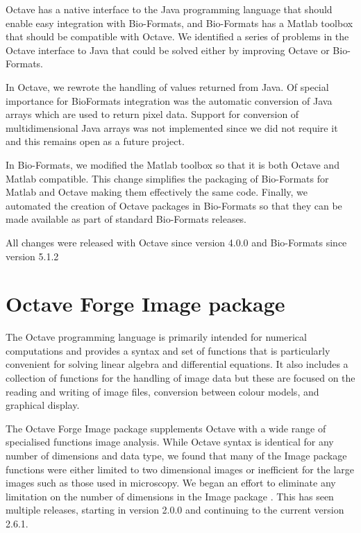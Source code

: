 Octave has a native interface to the Java programming language
that should enable easy integration with
Bio-Formats, and Bio-Formats has a Matlab toolbox that should be
compatible with Octave.
We identified a series of problems in the Octave interface to Java that
could be solved either by improving Octave or Bio-Formats.

In Octave, we rewrote the handling of values returned from Java.
Of special importance for BioFormats integration was the automatic conversion of
Java arrays which are used to return pixel data.
Support for conversion of multidimensional Java arrays was not implemented
since we did not require it and this remains open as a future project.

In Bio-Formats, we modified the Matlab toolbox so that it is
both Octave and Matlab compatible.
This change simplifies the packaging of
Bio-Formats for Matlab and Octave making them
effectively the same code.
Finally, we automated the creation of Octave packages in Bio-Formats
so that they can be made available as part of standard Bio-Formats releases.

All changes were released with Octave since version 4.0.0 and
Bio-Formats since version 5.1.2

\section{Octave Forge Image package}

The Octave programming language is primarily intended for numerical
computations and provides a syntax and set of functions that is particularly
convenient for solving linear algebra and differential equations.  It
also includes a collection of functions for the handling of image data
but these are focused on the reading and writing of image files,
conversion between colour models, and graphical display.

The Octave Forge Image package supplements Octave with a wide range of
specialised functions image analysis.  While Octave syntax is
identical for any number of dimensions and data type, we found that
many of the Image package functions were either limited to two
dimensional images or inefficient for the large images such as those used in
microscopy.  We began an effort to eliminate any
limitation on the number of dimensions in the Image package
.  This has seen multiple
releases, starting in version 2.0.0 and continuing to the current
version 2.6.1.


